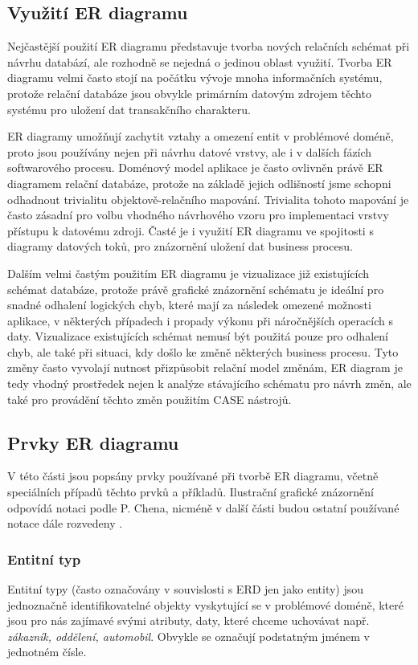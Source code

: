 \documentclass[czech,bachelor,public,dept460,male,oneside]{diploma}
\begin{document}
	\subsection{Využití ER diagramu}
	Nejčastější použití ER diagramu představuje tvorba nových relačních schémat při návrhu databází, ale rozhodně se nejedná o jedinou oblast využití. Tvorba ER diagramu velmi často stojí na počátku vývoje mnoha informačních systému, protože relační databáze jsou obvykle primárním datovým zdrojem těchto systému pro uložení dat transakčního charakteru. 
	
	ER diagramy umožňují zachytit vztahy a omezení entit v problémové doméně, proto jsou používány nejen při návrhu datové vrstvy, ale i v dalších fázích softwarového procesu. Doménový model aplikace je často ovlivněn právě ER diagramem relační databáze, protože na základě jejich odlišností jsme schopni odhadnout trivialitu objektově-relačního mapování. Trivialita tohoto mapování je často zásadní pro volbu vhodného návrhového vzoru pro implementaci vrstvy přístupu k datovému zdroji. Časté je i využití ER diagramu ve spojitosti s diagramy datových toků, pro znázornění uložení dat business procesu.
	
	Dalším velmi častým použitím ER diagramu je vizualizace již existujících schémat databáze, protože právě grafické znázornění schématu je ideální pro snadné odhalení logických chyb, které mají za následek omezené možnosti aplikace, v některých případech i propady výkonu při náročnějších operacích s daty. 
	Vizualizace existujících schémat nemusí být použitá pouze pro odhalení chyb, ale také při situaci, kdy došlo ke změně některých business procesu. Tyto změny často vyvolají nutnost přizpůsobit relační model změnám, ER diagram je tedy vhodný prostředek nejen k analýze stávajícího schématu pro návrh změn, ale také pro provádění těchto změn použitím CASE nástrojů.
	
	\subsection{Prvky ER diagramu} \label{erDiagramFeatures}
	V této části jsou popsány prvky používané při tvorbě ER diagramu, včetně speciálních případů těchto prvků a příkladů. Ilustrační grafické znázornění odpovídá notaci podle P. Chena, nicméně v další části budou ostatní používané notace dále rozvedeny \cite{erdSymbols}.
	
	\subsubsection{Entitní typ}
	Entitní typy (často označovány v souvislosti s ERD jen jako entity) jsou jednoznačně identifikovatelné objekty vyskytující se v problémové doméně, které jsou pro nás zajímavé svými atributy, daty, které chceme uchovávat např. \textit{zákazník, oddělení, automobil}. Obvykle se označují podstatným jménem v jednotném čísle. 
	
\end{document}
